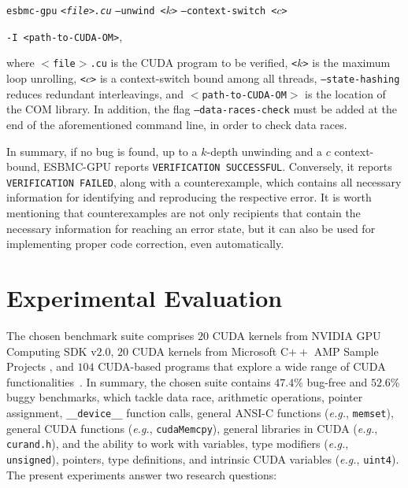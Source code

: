 \documentclass{llncs}
\begin{document}
\begin{center}
\vspace{1 mm}
\noindent \texttt{esbmc-gpu} \emph{\tt <file>.cu} {\tt --unwind <$k$>}  {\tt --context-switch <$c$>} %

 {\tt -I <path-to-CUDA-OM>},
\vspace{1 mm}
\end{center}

where {\tt $<$file$>$.cu} is the CUDA program to be verified, {\tt <$k$>} is the maximum loop unrolling, {\tt <$c$>} is a context-switch bound among all threads, {\tt --state-hashing} reduces redundant interleavings, and {\tt $<$path-to-CUDA-OM$>$} is the location of the COM library. In addition, the flag {\tt --data-races-check} must be added at the end of the aforementioned command line, in order to check data races.

In summary, if no bug is found, up to a $k$-depth unwinding and a $c$ context-bound, ESBMC-GPU reports {\tt VERIFICATION SUCCESSFUL}. Conversely, it reports {\tt VERIFICATION FAILED}, along with a counterexample, which contains all necessary information for identifying and reproducing the respective error. It is worth mentioning that counterexamples are not only recipients that contain the necessary information for reaching an error state, but it can also be used for implementing proper code correction, even automatically.

\section{Experimental Evaluation}
\label{sec:effectiveness}

The chosen benchmark suite comprises $20$ CUDA kernels from NVIDIA GPU Computing SDK v$2$.$0$, $20$ CUDA kernels from Microsoft C$++$ AMP Sample Projects%
, and $104$ CUDA-based programs that explore a wide range of CUDA functionalities~\cite{cuda:2012}. In summary, the chosen suite contains $47.4$\% bug-free and $52.6$\% buggy benchmarks, which tackle data race, arithmetic operations, pointer assignment, {\tt \_\_device\_\_} function calls, general ANSI-C functions ({\it e.g.}, \texttt{memset}), general CUDA functions ({\it e.g.}, \texttt{cudaMemcpy}), general libraries in CUDA ({\it e.g.}, \texttt{curand.h}), and the ability to work with variables, type modifiers ({\it e.g.}, \texttt{unsigned}), pointers, type definitions, and intrinsic CUDA variables ({\it e.g.}, \texttt{uint4}).  The present experiments answer two research questions:
\end{document}
